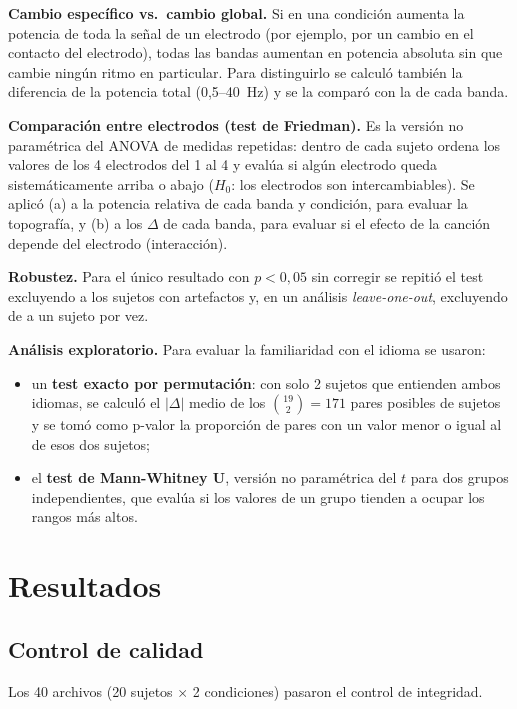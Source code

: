 \documentclass[11pt,a4paper]{article}
\begin{document}
\textbf{Cambio específico vs.\ cambio global.} Si en una condición aumenta la potencia de toda la señal de un electrodo (por ejemplo, por un cambio en el contacto del electrodo), todas las bandas aumentan en potencia absoluta sin que cambie ningún ritmo en particular. Para distinguirlo se calculó también la diferencia de la potencia total (0,5--40~Hz) y se la comparó con la de cada banda.

\textbf{Comparación entre electrodos (test de Friedman).} Es la versión no paramétrica del ANOVA de medidas repetidas: dentro de cada sujeto ordena los valores de los 4 electrodos del 1 al 4 y evalúa si algún electrodo queda sistemáticamente arriba o abajo ($H_0$: los electrodos son intercambiables). Se aplicó (a) a la potencia relativa de cada banda y condición, para evaluar la topografía, y (b) a los $\Delta$ de cada banda, para evaluar si el efecto de la canción depende del electrodo (interacción).

\textbf{Robustez.} Para el único resultado con $p < 0{,}05$ sin corregir se repitió el test excluyendo a los sujetos con artefactos y, en un análisis \textit{leave-one-out}, excluyendo de a un sujeto por vez.

\textbf{Análisis exploratorio.} Para evaluar la familiaridad con el idioma se usaron:
\begin{itemize}
  \item un \textbf{test exacto por permutación}: con solo 2 sujetos que entienden ambos idiomas, se calculó el $|\Delta|$ medio de los $\binom{19}{2} = 171$ pares posibles de sujetos y se tomó como p-valor la proporción de pares con un valor menor o igual al de esos dos sujetos;
  \item el \textbf{test de Mann-Whitney U}, versión no paramétrica del $t$ para dos grupos independientes, que evalúa si los valores de un grupo tienden a ocupar los rangos más altos.
\end{itemize}

\section{Resultados}

\subsection{Control de calidad}
Los 40 archivos (20 sujetos $\times$ 2 condiciones) pasaron el control de integridad.
\end{document}
